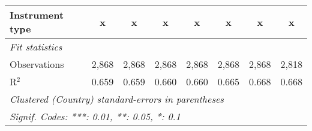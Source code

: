 \begin{tabular}{lccccccc}
   Instrument type                                                                  & x            & x             & x             & x             & x            & x            & x\\  
   \midrule \emph{Fit statistics}\\
   Observations                                                                     & 2,868        & 2,868         & 2,868         & 2,868         & 2,868        & 2,868        & 2,818\\  
   R$^2$                                                                            & 0.659        & 0.659         & 0.660         & 0.660         & 0.665        & 0.668        & 0.668\\  
   \midrule
   \multicolumn{8}{l}{\emph{Clustered (Country) standard-errors in parentheses}}\\
   \multicolumn{8}{l}{\emph{Signif. Codes: ***: 0.01, **: 0.05, *: 0.1}}\\
\end{tabular}
\par\endgroup



